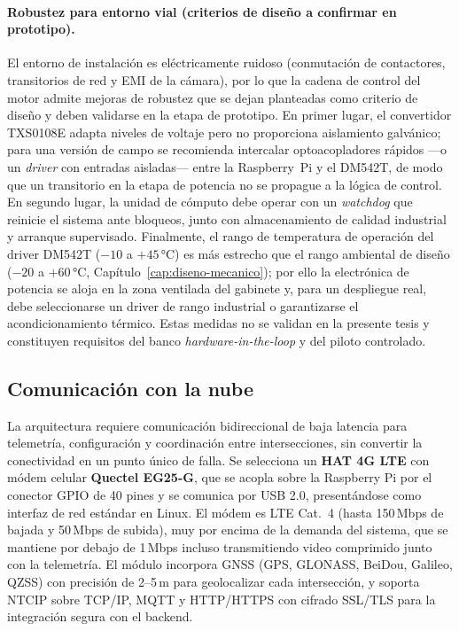 \paragraph{Robustez para entorno vial (criterios de diseño a confirmar en prototipo).} El entorno de
instalación es eléctricamente ruidoso (conmutación de contactores, transitorios de red y EMI de la cámara),
por lo que la cadena de control del motor admite mejoras de robustez que se dejan planteadas como criterio de
diseño y deben validarse en la etapa de prototipo. En primer lugar, el convertidor TXS0108E adapta niveles de
voltaje pero no proporciona aislamiento galvánico; para una versión de campo se recomienda intercalar
optoacopladores rápidos —o un \emph{driver} con entradas aisladas— entre la Raspberry~Pi y el DM542T, de modo
que un transitorio en la etapa de potencia no se propague a la lógica de control. En segundo lugar, la unidad
de cómputo debe operar con un \textit{watchdog} que reinicie el sistema ante bloqueos, junto con
almacenamiento de calidad industrial y arranque supervisado. Finalmente, el rango de temperatura de operación
del driver DM542T ($-10$ a $+45$\,°C) es más estrecho que el rango ambiental de diseño ($-20$ a $+60$\,°C,
Capítulo~\ref{cap:diseno-mecanico}); por ello la electrónica de potencia se aloja en la zona ventilada del
gabinete y, para un despliegue real, debe seleccionarse un driver de rango industrial o garantizarse el
acondicionamiento térmico. Estas medidas no se validan en la presente tesis y constituyen requisitos del banco
\textit{hardware-in-the-loop} y del piloto controlado.

\subsection{Comunicación con la nube}\label{subsec:comunicacion}

La arquitectura requiere comunicación bidireccional de baja latencia para telemetría, configuración y
coordinación entre intersecciones, sin convertir la conectividad en un punto único de falla. Se selecciona
un \textbf{HAT 4G LTE} con módem celular \textbf{Quectel EG25-G}, que se acopla sobre la Raspberry Pi por el
conector GPIO de 40 pines y se comunica por USB 2.0, presentándose como interfaz de red estándar en Linux.
El módem es LTE Cat.~4 (hasta 150\,Mbps de bajada y 50\,Mbps de subida), muy por encima de la demanda del
sistema, que se mantiene por debajo de 1\,Mbps incluso transmitiendo video comprimido junto con la
telemetría. El módulo incorpora GNSS (GPS, GLONASS, BeiDou, Galileo, QZSS) con precisión de 2--5\,m para
geolocalizar cada intersección, y soporta NTCIP sobre TCP/IP, MQTT y HTTP/HTTPS con cifrado SSL/TLS para la
integración segura con el backend.

